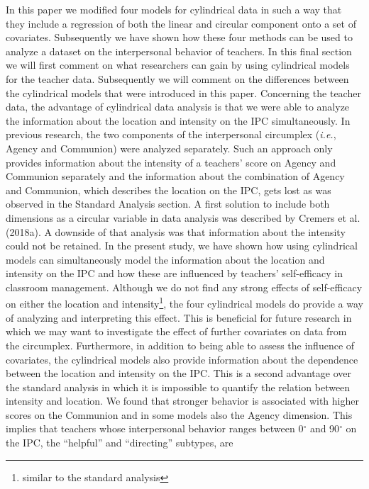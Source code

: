 \documentclass[man,mask]{apa6}
\let\rmarkdownfootnote\footnote%
\def\footnote{\protect\rmarkdownfootnote}
\begin{document}
In this paper we modified four models for cylindrical data in such a way that
they include a regression of both the linear and circular component onto a set of
covariates. Subsequently we have shown how these four methods can be used to
analyze a dataset on the interpersonal behavior of teachers. In this final
section we will first comment on what researchers can gain by using cylindrical
models for the teacher data. Subsequently we will comment on the differences
between the cylindrical models that were introduced in this paper.\newline
\indent Concerning the teacher data, the advantage of cylindrical data analysis
is that we were able to analyze the information about the location and intensity
on the IPC simultaneously. In previous research, the two components of the
interpersonal circumplex (\emph{i.e.}, Agency and Communion) were analyzed
separately. Such an approach only provides information about the intensity of a
teachers' score on Agency and Communion separately and the information about the
combination of Agency and Communion, which describes the location on the IPC,
gets lost as was observed in the Standard Analysis section. A first solution to
include both dimensions as a circular variable in data analysis was described by
Cremers et al. (2018a). A downside of that analysis was that information about
the intensity could not be retained. In the present study, we have shown how
using cylindrical models can simultaneously model the information about the
location and intensity on the IPC and how these are influenced by teachers'
self-efficacy in classroom management. Although we do not find any strong
effects of self-efficacy on either the location and intensity\footnote{similar
to the standard analysis}, the four cylindrical models do provide a way of
analyzing and interpreting this effect. This is beneficial for future research
in which we may want to investigate the effect of further covariates on data
from the circumplex. \newline
\indent Furthermore, in addition to being able to assess the influence of
covariates, the cylindrical models also provide information about the dependence
between the location and intensity on the IPC. This is a second advantage over
the standard analysis in which it is impossible to quantify the relation between
intensity and location. We found that stronger behavior is associated with
higher scores on the Communion and in some models also the Agency dimension.
This implies that teachers whose interpersonal behavior ranges between
0\(^\circ\) and 90\(^\circ\) on the IPC, the \enquote{helpful} and \enquote{directing} subtypes, are
\end{document}
